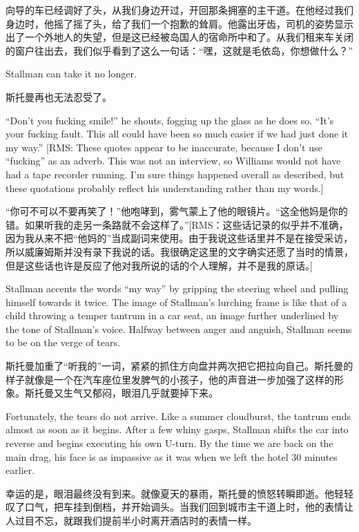 \ifdefined\chs
向导的车已经调好了头，从我们身边开过，开回那条拥塞的主干道。在他经过我们身边时，他摇了摇了头，给了我们一个抱歉的耸肩。他露出牙齿，司机的姿势显示出了一个外地人的失望，但是这已经被岛国人的宿命所中和了。从我们租来车关闭的窗户往出去，我们似乎看到了这么一句话：“嘿，这就是毛依岛，你想做什么？”
\fi

\ifdefined\eng
Stallman can take it no longer.
\fi

\ifdefined\chs
斯托曼再也无法忍受了。
\fi

\ifdefined\eng
``Don't you fucking smile!'' he shouts, fogging up the glass as he does so. ``It's your fucking fault. This all could have been so much easier if we had just done it my way.'' [RMS: These quotes appear to be inaccurate, because I don't use ``fucking'' as an adverb.  This was not an interview, so Williams would not have had a tape recorder running.  I'm sure things happened overall as described, but these quotations probably reflect his understanding rather than my words.]
\fi

\ifdefined\chs
“你可不可以不要再笑了！”他咆哮到，雾气蒙上了他的眼镜片。“这全他妈是你的错。如果听我的走另一条路就不会这样了。”[RMS：这些话记录的似乎并不准确，因为我从来不把“他妈的”当成副词来使用。由于我说这些话里并不是在接受采访，所以威廉姆斯并没有录下我说的话。我很确定这里的文字确实还愿了当时的情景，但是这些话也许是反应了他对我所说的话的个人理解，并不是我的原话。]
\fi

\ifdefined\eng
Stallman accents the words ``my way'' by gripping the steering wheel and pulling himself towards it twice. The image of Stallman's lurching frame is like that of a child throwing a temper tantrum in a car seat, an image further underlined by the tone of Stallman's voice. Halfway between anger and anguish, Stallman seems to be on the verge of tears.
\fi

\ifdefined\chs
斯托曼加重了“听我的”一词，紧紧的抓住方向盘并两次把它把拉向自己。斯托曼的样子就像是一个在汽车座位里发脾气的小孩子，他的声音进一步加强了这样的形象。斯托曼又生气又郁闷，眼泪几乎就要掉下来。
\fi

\ifdefined\eng
Fortunately, the tears do not arrive. Like a summer cloudburst, the tantrum ends almost as soon as it begins. After a few whiny gasps, Stallman shifts the car into reverse and begins executing his own U-turn. By the time we are back on the main drag, his face is as impassive as it was when we left the hotel 30 minutes earlier.
\fi

\ifdefined\chs
幸运的是，眼泪最终没有到来。就像夏天的暴雨，斯托曼的愤怒转瞬即逝。他轻轻叹了口气，把车挂到倒档，并开始调头。当我们回到城市主干道上时，他的表情让人过目不忘，就跟我们提前半小时离开酒店时的表情一样。
\fi

